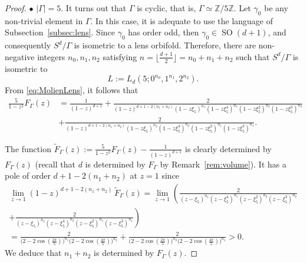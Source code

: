 \documentclass[12pt,a4paper,final]{amsart}
\theoremstyle{plain}
\theoremstyle{definition}
\theoremstyle{remark}
\numberwithin{equation}{section}
\newcommand{\Z}{\mathbb Z}
\DeclareMathOperator{\SO}{SO}
\begin{document}
\begin{proof}
\medskip\noindent$\bullet$
$|\Gamma|=5$. 
It turns out that $\Gamma$ is cyclic, that is, $\Gamma\simeq \Z/5\Z$. 
Let $\gamma_0$ be any non-trivial element in $\Gamma$. 
In this case, it is adequate to use the language of Subsection~\ref{subsec:lens}. 
Since $\gamma_0$ has order odd, then $\gamma_0\in\SO(d+1)$, and consequently $S^{d}/\Gamma$ is isometric to a lens orbifold.
Therefore, there are non-negative integers $n_0,n_1,n_2$ satisfying $n=\lfloor\frac{d+1}{2}\rfloor=n_0+n_1+n_2$ such that $S^d/\Gamma$ is isometric to 
$$
L:=L_d(5;0^{n_0},1^{n_1},2^{n_2}).
$$
From \eqref{eq:MolienLens}, it follows that
\begin{align*}
\frac{5}{1-z^2}F_{\Gamma}(z)  &
=\frac{1}{(1-z)^{d+1}}+
\frac{2}{(1-z)^{d+1-2(n_1+n_2)} (1-z\xi_5)^{n_1}(1-z\xi_5^4)^{n_1}	(1-z\xi_5^2)^{n_2}(1-z\xi_5^3)^{n_2} }
\\ &
+ \frac{2}{(1-z)^{d+1-2(n_1+n_2)} (1-z\xi_5)^{n_2} (1-z\xi_5^4)^{n_2} (1-z\xi_5^2)^{n_1}(1-z\xi_5^3)^{n_1}}
. 
\end{align*}

The function $\widetilde F_{\Gamma}(z):=
\frac{5}{1-z^2}F_{\Gamma}(z) -\frac{1}{(1-z)^{d+1}} $ is clearly determined by $F_{\Gamma}(z)$ (recall that $d$ is determined by $F_\Gamma$ by Remark~\ref{rem:volume}). 
It has a pole of order $d+1-2(n_1+n_2)$ at $z=1$ since 
\begin{multline} \label{eq5:degreepole}
\lim_{z\to1}(1-z)^{d+1-2(n_1+n_2)}\,\widetilde F_{\Gamma}(z)
= \lim_{z\to1} \left(
\frac{2}{ (z-\xi_5)^{n_1}(z-\xi_5^4)^{n_1}	(z-\xi_5^2)^{n_2}(z-\xi_5^3)^{n_2} }
\right.
\\ 
+\left. \frac{2}{(z-\xi_5)^{n_2} (z-\xi_5^4)^{n_2} (z-\xi_5^2)^{n_1}(z-\xi_5^3)^{n_1}}\right)
\\  
=
\frac{2}{\big(2-2\cos(\tfrac{2\pi}{5})\big)^{n_1} \big(2-2\cos(\tfrac{4\pi}{5})\big)^{n_2}}
+\frac{2}{\big(2-2\cos(\tfrac{2\pi}{5})\big)^{n_2} \big(2-2\cos(\tfrac{4\pi}{5})\big)^{n_1}}>0
.
\end{multline}
We deduce that $n_1+n_2$ is determined by $F_{\Gamma}(z)$.




\end{proof}
\end{document}
